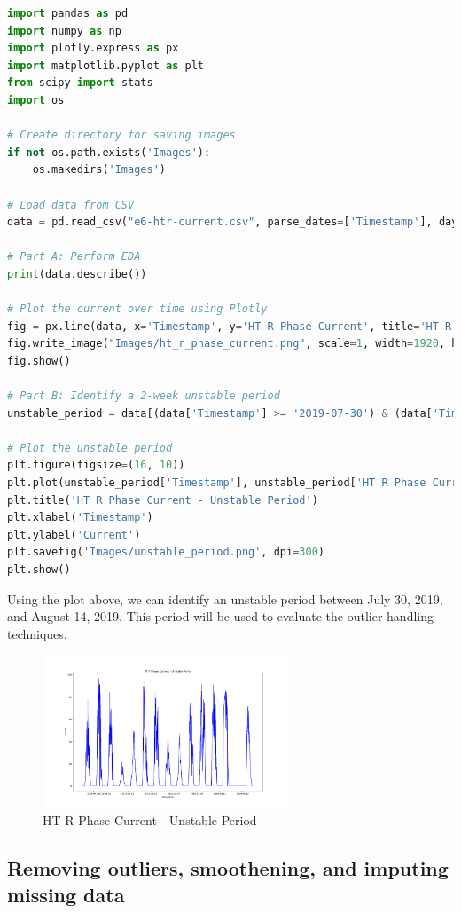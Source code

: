 \begin{lstlisting}[language=Python]
import pandas as pd
import numpy as np
import plotly.express as px
import matplotlib.pyplot as plt
from scipy import stats
import os

# Create directory for saving images
if not os.path.exists('Images'):
    os.makedirs('Images')

# Load data from CSV
data = pd.read_csv("e6-htr-current.csv", parse_dates=['Timestamp'], dayfirst=True)

# Part A: Perform EDA
print(data.describe())

# Plot the current over time using Plotly
fig = px.line(data, x='Timestamp', y='HT R Phase Current', title='HT R Phase Current over Time')
fig.write_image("Images/ht_r_phase_current.png", scale=1, width=1920, height=1080, format='png')
fig.show()

# Part B: Identify a 2-week unstable period
unstable_period = data[(data['Timestamp'] >= '2019-07-30') & (data['Timestamp'] <= '2019-08-14')].copy()

# Plot the unstable period
plt.figure(figsize=(16, 10))
plt.plot(unstable_period['Timestamp'], unstable_period['HT R Phase Current'], color='blue')
plt.title('HT R Phase Current - Unstable Period')
plt.xlabel('Timestamp')
plt.ylabel('Current')
plt.savefig('Images/unstable_period.png', dpi=300)
plt.show()
\end{lstlisting}

Using the plot above, we can identify an unstable period between July 30, 2019, and August 14, 2019. This period will be used to evaluate the outlier handling techniques.

\begin{figure}[H]
	\centering
	\includegraphics[width=0.65\textwidth]{./Images/unstable_period.png}
	\caption{HT R Phase Current - Unstable Period}
\end{figure}

\subsection{Removing outliers, smoothening, and imputing missing data}

